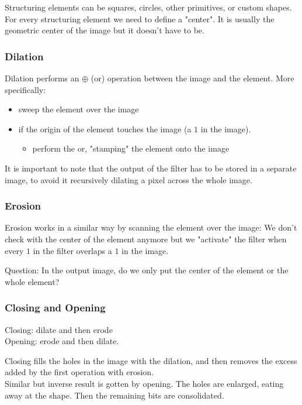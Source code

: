 \documentclass{article}
\begin{document}
Structuring elements can be squares, circles, other primitives, or custom shapes. For every structuring element we need to define a "center". It is usually the geometric center of the image but it doesn't have to be.

\subsubsection{Dilation}
Dilation performs an $\oplus$ (or) operation between the image and the element. More specifically:
\begin{itemize}
    \item sweep the element over the image
    \item if the origin of the element touches the image (a $1$ in the image).
        \begin{itemize}
            \item perform the or, "stamping" the element onto the image
        \end{itemize}
\end{itemize}
It is important to note that the output of the filter has to be stored in a separate image, to avoid it recursively dilating a pixel across the whole image.

\subsubsection{Erosion}
Erosion works in a similar way by scanning the element over the image: We don't check with the center of the element anymore but we "activate" the filter when every $1$ in the filter overlaps a $1$ in the image.

Question: In the output image, do we only put the center of the element or the whole element?

\subsubsection{Closing and Opening}
Closing: dilate and then erode \\
Opening: erode and then dilate.

Closing fills the holes in the image with the dilation, and then removes the excess added by the first operation with erosion.\\
Similar but inverse result is gotten by opening. The holes are enlarged, eating away at the shape. Then the remaining bits are consolidated.
\end{document}
